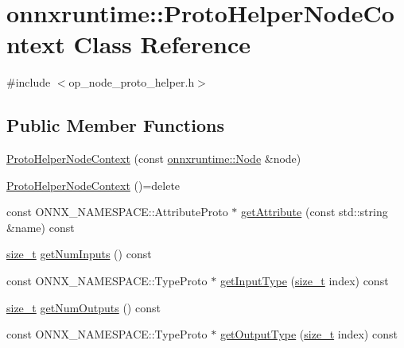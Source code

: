 \hypertarget{classonnxruntime_1_1ProtoHelperNodeContext}{}\section{onnxruntime\+:\+:Proto\+Helper\+Node\+Context Class Reference}
\label{classonnxruntime_1_1ProtoHelperNodeContext}


{\ttfamily \#include $<$op\+\_\+node\+\_\+proto\+\_\+helper.\+h$>$}

\subsection*{Public Member Functions}
\begin{DoxyCompactItemize}
\item 
\mbox{\hyperlink{classonnxruntime_1_1ProtoHelperNodeContext_a6ff3ba55c42827096883b9ab10ca6ea8}{Proto\+Helper\+Node\+Context}} (const \mbox{\hyperlink{classonnxruntime_1_1Node}{onnxruntime\+::\+Node}} \&node)
\item 
\mbox{\hyperlink{classonnxruntime_1_1ProtoHelperNodeContext_a1f2fcd983214eca7f5934b2e4630a900}{Proto\+Helper\+Node\+Context}} ()=delete
\item 
const O\+N\+N\+X\+\_\+\+N\+A\+M\+E\+S\+P\+A\+C\+E\+::\+Attribute\+Proto $\ast$ \mbox{\hyperlink{classonnxruntime_1_1ProtoHelperNodeContext_ae7badea4b892d591002104cc7a4db1f4}{get\+Attribute}} (const std\+::string \&name) const
\item 
\mbox{\hyperlink{mlasi_8h_a503efbc1c6e50825320ad909366b78ab}{size\+\_\+t}} \mbox{\hyperlink{classonnxruntime_1_1ProtoHelperNodeContext_af581a10fb8f873e547b01cbc5e542bc7}{get\+Num\+Inputs}} () const
\item 
const O\+N\+N\+X\+\_\+\+N\+A\+M\+E\+S\+P\+A\+C\+E\+::\+Type\+Proto $\ast$ \mbox{\hyperlink{classonnxruntime_1_1ProtoHelperNodeContext_a12349a7d2ed7b7d1253a077a29ec543c}{get\+Input\+Type}} (\mbox{\hyperlink{mlasi_8h_a503efbc1c6e50825320ad909366b78ab}{size\+\_\+t}} index) const
\item 
\mbox{\hyperlink{mlasi_8h_a503efbc1c6e50825320ad909366b78ab}{size\+\_\+t}} \mbox{\hyperlink{classonnxruntime_1_1ProtoHelperNodeContext_a8d173fbe4f9c640135268154868d32df}{get\+Num\+Outputs}} () const
\item 
const O\+N\+N\+X\+\_\+\+N\+A\+M\+E\+S\+P\+A\+C\+E\+::\+Type\+Proto $\ast$ \mbox{\hyperlink{classonnxruntime_1_1ProtoHelperNodeContext_a89edb584b2211b71b5354ba4127ea7dd}{get\+Output\+Type}} (\mbox{\hyperlink{mlasi_8h_a503efbc1c6e50825320ad909366b78ab}{size\+\_\+t}} index) const
\end{DoxyCompactItemize}


